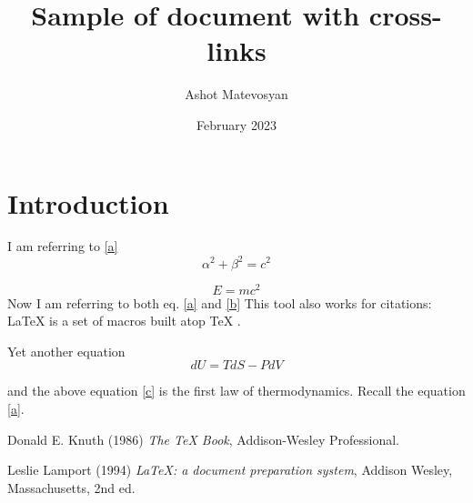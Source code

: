 \documentclass{article}
\title{Sample of document with cross-links}
\author{Ashot Matevosyan}
\date{February 2023}
\begin{document}
\maketitle

\section{Introduction}
I am referring to \eqref{a}
\begin{equation} \label{a}
    \alpha^2+\beta^2=c^2
\end{equation}

\begin{equation} \label{b}
    E=m c^2
\end{equation}
Now I am referring to both eq. \eqref{a} and \eqref{b}
\vspace{1cm}
This tool also works for citations:
\LaTeX{} \cite{lamport94} is a set of macros built atop \TeX{} \cite{texbook}.

\newpage
Yet another equation
\begin{equation} \label{c}
    d U=T d S - P d V
\end{equation}

and the above equation \eqref{c} is the first law of thermodynamics. Recall the equation \eqref{a}.
\newpage




\begin{thebibliography}{9}
Donald E. Knuth (1986) \emph{The \TeX{} Book}, Addison-Wesley Professional.

Leslie Lamport (1994) \emph{\LaTeX: a document preparation system}, Addison
Wesley, Massachusetts, 2nd ed.
\end{thebibliography}
\end{document}
